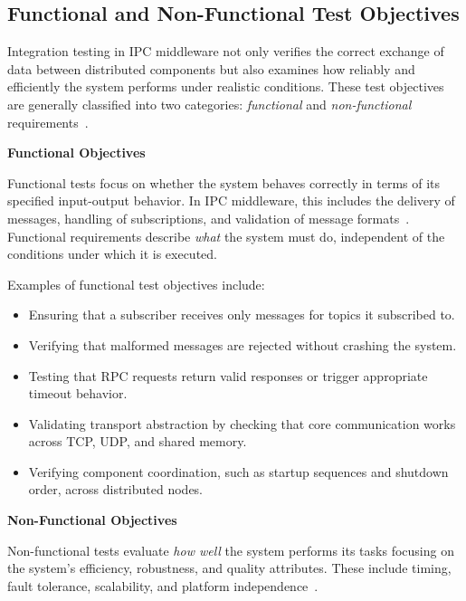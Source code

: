\subsection{Functional and Non-Functional Test Objectives}

Integration testing in IPC middleware not only verifies the correct exchange of data between distributed components but also examines how reliably and efficiently the system performs under realistic conditions. These test objectives are generally classified into two categories: \textit{functional} and \textit{non-functional} requirements~\cite{gorton2006software, tanenbaum2017, spillner2019softwaretest}.

\vspace{1em}
\textbf{Functional Objectives}

\vspace{0.4em}
Functional tests focus on whether the system behaves correctly in terms of its specified input-output behavior. In IPC middleware, this includes the delivery of messages, handling of subscriptions, and validation of message formats~\cite{burnstein2003practical, spillner2019softwaretest}. Functional requirements describe \textit{what} the system must do, independent of the conditions under which it is executed.

\vspace{1em}
Examples of functional test objectives include:

\begin{itemize}
	\item Ensuring that a subscriber receives only messages for topics it subscribed to.
	\item Verifying that malformed messages are rejected without crashing the system.
	\item Testing that RPC requests return valid responses or trigger appropriate timeout behavior.
	\item Validating transport abstraction by checking that core communication works across TCP, UDP, and shared memory.
	\item Verifying component coordination, such as startup sequences and shutdown order, across distributed nodes.
\end{itemize}

\vspace{1em}
\textbf{Non-Functional Objectives}

\vspace{0.4em}
Non-functional tests evaluate \textit{how well} the system performs its tasks focusing on the system’s efficiency, robustness, and quality attributes. These include timing, fault tolerance, scalability, and platform independence~\cite{stallings2018, spillner2019softwaretest}.

